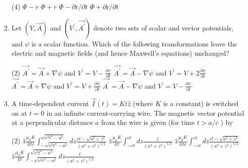 \begin{enumerate}
	{	}
	\begin{tasks}(4)
		\task[\textbf{A.}] $\Phi-r$
		\task[\textbf{B.}] $\Phi+r$
		\task[\textbf{C.}] $\Phi-\partial \mathrm{r} / \partial t$
		\task[\textbf{D.}] $\Phi+\partial \mathrm{r} / \partial t$
	\end{tasks}
	\item
	Let $(V, \vec{A})$ and $\left(V^{\prime}, \overrightarrow{A^{\prime}}\right)$ denote two sets of scalar and vector potentials, and $\psi$ is a scalar function. Which of the following transformations leave the electric and magnetic fields (and hence Maxwell's equations) unchanged?
	{}
	\begin{tasks}(2)
		\task[\textbf{A.}] $\overrightarrow{A^{\prime}}=\vec{A}+\nabla \psi$ and $V^{\prime}=V-\frac{\partial \psi}{\partial t}$
		\task[\textbf{B.}] $\overrightarrow{A^{\prime}}=\vec{A}-\nabla \psi$ and $V^{\prime}=V+2 \frac{\partial \psi}{\partial t}$
		\task[\textbf{C.}] $\overrightarrow{A^{\prime}}=\vec{A}+\nabla \psi$ and $V^{\prime}=V+\frac{\partial \psi}{\partial t}$
		\task[\textbf{D.}] $\overrightarrow{A^{\prime}}=\vec{A}-\nabla \psi$ and $V^{\prime}=V-\frac{\partial \psi}{\partial t}$
	\end{tasks}
	\item
	A time-dependent current $\vec{I}(t)=K t \hat{z}$ (where $K$ is a constant) is switched on at $t=0$ in an infinite current-carrying wire. The magnetic vector potential at a perpendicular distance $a$ from the wire is given (for time $t>a / c$ ) by
	{	}
	\begin{tasks}(2)
		\task[\textbf{A.}]  $\hat{z} \frac{\mu_{0} K}{4 \pi c} \int_{-\sqrt{c^{2} t^{2}-a^{2}}}^{\sqrt{c^{2} t^{2}-a^{2}}} d z \frac{c t-\sqrt{a^{2}+z^{2}}}{\left(a^{2}+z^{2}\right)^{1 / 2}}$
		\task[\textbf{B.}]  $\hat{z} \frac{\mu_{0} K}{4 \pi} \int_{-c t}^{c t} d z \frac{t}{\left(a^{2}+z^{2}\right)^{1 / 2}}$
		\task[\textbf{C.}] $\hat{z} \frac{\mu_{0} K}{4 \pi c} \int_{-c t}^{c t} d z \frac{c t-\sqrt{a^{2}+z^{2}}}{\left(a^{2}+z^{2}\right)^{1 / 2}}$
		\task[\textbf{D.}] $\hat{z} \frac{\mu_{0} K}{4 \pi} \int_{-\sqrt{c^{2} t^{2}-a^{2}}}^{\sqrt{c^{2} t^{2}-a^{2}}} d z \frac{t}{\left(a^{2}+z^{2}\right)^{1 / 2}}$
	\end{tasks}
	

\end{enumerate}
